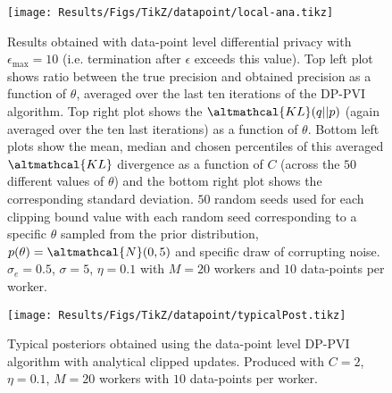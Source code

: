\begin{figure}
	\texttt{[image: Results/Figs/TikZ/datapoint/local-ana.tikz]}
	\centering
	\caption{\label{fig:results-local-ana} Results obtained with data-point level differential privacy with $\epsilon_{\text{max}} = 10$ (i.e. termination after $\epsilon$ exceeds this value). Top left plot shows ratio between the true precision and obtained precision as a function of $\theta$, averaged over the last ten iterations of the DP-PVI algorithm. Top right plot shows the $\altmathcal{KL}(q||p)$ (again averaged over the ten last iterations) as a function of $\theta$. Bottom left plots show the mean, median and chosen percentiles of this averaged $\altmathcal{KL}$ divergence as a function of $C$ (across the $50$ different values of $\theta$) and the bottom right plot shows the corresponding standard deviation. $50$ random seeds used for each clipping bound value with each random seed corresponding to a specific $\theta$ sampled from the prior distribution, $p(\theta) = \altmathcal{N}(0, 5)$ and specific draw of corrupting noise. $\sigma_e = 0.5$, $\sigma=5$, $\eta=0.1$ with $M=20$ workers and $10$ data-points per worker. }
\end{figure}

\begin{figure}
	\texttt{[image: Results/Figs/TikZ/datapoint/typicalPost.tikz]}
	\centering
	\caption{\label{fig:results-local-ana-post} Typical posteriors obtained using the data-point level DP-PVI algorithm with analytical clipped updates. Produced with $C=2$, $\eta=0.1$, $M=20$ workers with $10$ data-points per worker. }
\end{figure}


